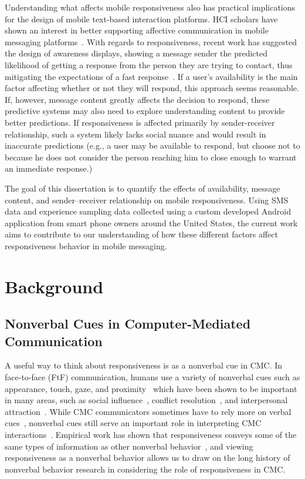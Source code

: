 \documentclass[12pt]{nuthesis}	%
\begin{document}
Understanding what affects mobile responsiveness also has practical implications for the design of mobile text-based interaction platforms. HCI scholars have shown an interest in better supporting affective communication in mobile messaging platforms~\citep[e.g.][]{amin2005sensems}. With regards to responsiveness, recent work has suggested the design of awareness displays, showing a message sender the predicted likelihood of getting a response from the person they are trying to contact, thus mitigating the expectations of a fast response~\citep{pielot2014didn}. If a user's availability is the main factor affecting whether or not they will respond, this approach seems reasonable. If, however, message content greatly affects the decision to respond, these predictive systems may also need to explore understanding content to provide better predictions. If responsiveness is affected primarily by sender-receiver relationship, such a system likely lacks social nuance and would result in inaccurate predictions (e.g., a user may be available to respond, but choose not to because he does not consider the person reaching him to close enough to warrant an immediate response.)

The goal of this dissertation is to quantify the effects of availability, message content, and sender--receiver relationship on mobile responsiveness. Using SMS data and experience sampling data collected using a custom developed Android application from smart phone owners around the United States, the current work aims to contribute to our understanding of how these different factors affect responsiveness behavior in mobile messaging.

\chapter{Background}

\section{Nonverbal Cues in Computer-Mediated Communication}

A useful way to think about responsiveness is as a nonverbal cue in CMC. In face-to-face (FtF) communication, humans use a variety of nonverbal cues such as appearance, touch, gaze, and proximity~\citep{burgoon2016nonverbal} which have been shown to be important in many areas, such as social influence~\citep{hogg2006social}, conflict resolution~\citep{ting2001managing}, and interpersonal attraction~\citep{burgoon1991relational,erceau2007tactile}. While CMC communicators sometimes have to rely more on verbal cues~\citep{walther2005let}, nonverbal cues still serve an important role in interpreting CMC interactions~\citep{lo2008nonverbal,tidwell2002computer,walther1992interpersonal}. Empirical work has shown that responsiveness conveys some of the same types of information as other nonverbal behavior~\citep{kalman2013online}, and viewing responsiveness as a nonverbal behavior allows us to draw on the long history of nonverbal behavior research in considering the role of responsiveness in CMC.
\end{document}
